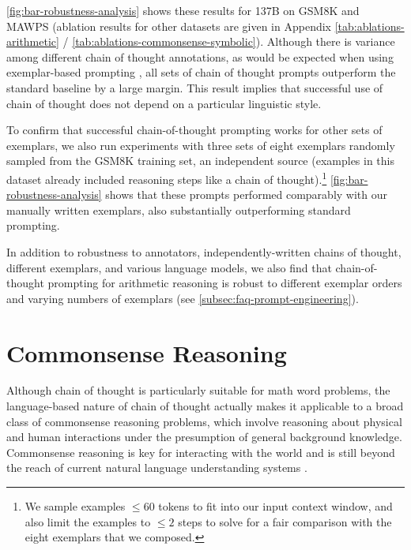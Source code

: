 \cref{fig:bar-robustness-analysis} shows these results for \lamda{} 137B on GSM8K and MAWPS (ablation results for other datasets are given in Appendix \cref{tab:ablations-arithmetic} / \cref{tab:ablations-commonsense-symbolic}).
Although there is variance among different chain of thought annotations, as would be expected when using exemplar-based prompting \citep{le-scao-rush-2021-many,reynolds2021prompt,zhao2021calibrate}, all sets of chain of thought prompts outperform the standard baseline by a large margin. 
This result implies that successful use of chain of thought does not depend on a particular linguistic style.

To confirm that successful chain-of-thought prompting works for other sets of exemplars, we also run experiments with three sets of eight exemplars randomly sampled from the GSM8K training set, an independent source (examples in this dataset already included reasoning steps like a chain of thought).\footnote{We sample examples $\leq 60$ tokens to fit into our input context window, and also limit the examples to $\leq 2$ steps to solve for a fair comparison with the eight exemplars that we composed.}
\cref{fig:bar-robustness-analysis} shows that these prompts performed comparably with our manually written exemplars, also substantially outperforming standard prompting.

In addition to robustness to annotators, independently-written chains of thought, different exemplars, and various language models, we also find that chain-of-thought prompting for arithmetic reasoning is robust to different exemplar orders and varying numbers of exemplars (see \cref{subsec:faq-prompt-engineering}).

\section{Commonsense Reasoning}\label{sec:commonsense-reasoning}

Although chain of thought is particularly suitable for math word problems, the language-based nature of chain of thought actually makes it applicable to a broad class of commonsense reasoning problems, which involve reasoning about physical and human interactions under the presumption of general background knowledge.
Commonsense reasoning is key for interacting with the world and is still beyond the reach of current natural language understanding systems \citep{talmor2022commonsenseqa}.

